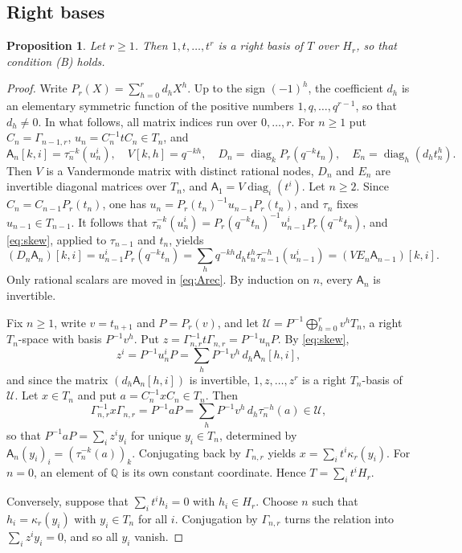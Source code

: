 \documentclass[11pt,a4paper]{amsart}
\newtheorem{proposition}[theorem]{Proposition}
\numberwithin{equation}{section}
\newcommand{\diag}{\operatorname{diag}}
\newcommand{\Q}{\mathbb{Q}}
\newcommand{\Asf}{\mathsf{A}}
\begin{document}
\subsection{Right bases}

\begin{proposition}\label{prop:B}
Let $r\ge1$. Then $1,t,\dots,t^r$ is a right basis of $T$ over $H_r$, so that condition \textup{(B)} holds.
\end{proposition}

\begin{proof}
Write $P_r(X)=\sum_{h=0}^{r}d_hX^h$. Up to the sign $(-1)^h$, the coefficient $d_h$ is an elementary symmetric function of the positive numbers $1,q,\dots,q^{r-1}$, so that $d_h\ne0$. In what follows, all matrix indices run over $0,\dots,r$. For $n\ge1$ put $C_n=\Gamma_{n-1,r}$, $u_n=C_n^{-1}tC_n\in T_n$, and
\[
\Asf_n[k,i]=\tau_n^{-k}(u_n^i),\quad V[k,h]=q^{-kh},\quad D_n=\diag_kP_r(q^{-k}t_n),\quad E_n=\diag_h(d_ht_n^h).
\]
Then $V$ is a Vandermonde matrix with distinct rational nodes, $D_n$ and $E_n$ are invertible diagonal matrices over $T_n$, and $\Asf_1=V\diag_i(t^i)$. Let $n\ge2$. Since $C_n=C_{n-1}P_r(t_n)$, one has $u_n=P_r(t_n)^{-1}u_{n-1}P_r(t_n)$, and $\tau_n$ fixes $u_{n-1}\in T_{n-1}$. It follows that $\tau_n^{-k}(u_n^i)=P_r(q^{-k}t_n)^{-1}u_{n-1}^iP_r(q^{-k}t_n)$, and \eqref{eq:skew}, applied to $\tau_{n-1}$ and $t_n$, yields
\begin{equation}\label{eq:Arec}
(D_n\Asf_n)[k,i]=u_{n-1}^iP_r(q^{-k}t_n)=\sum_hq^{-kh}d_ht_n^h\tau_{n-1}^{-h}(u_{n-1}^i)=(VE_n\Asf_{n-1})[k,i].
\end{equation}
Only rational scalars are moved in \eqref{eq:Arec}. By induction on $n$, every $\Asf_n$ is invertible.

Fix $n\ge1$, write $v=t_{n+1}$ and $P=P_r(v)$, and let $\mathcal U=P^{-1}\bigoplus_{h=0}^{r}v^hT_n$, a right $T_n$-space with basis $P^{-1}v^h$. Put $z=\Gamma_{n,r}^{-1}t\Gamma_{n,r}=P^{-1}u_nP$. By \eqref{eq:skew},
\begin{equation}\label{eq:zpowers}
z^i=P^{-1}u_n^iP=\sum_{h}P^{-1}v^h\,d_h\Asf_n[h,i],
\end{equation}
and since the matrix $(d_h\Asf_n[h,i])$ is invertible, $1,z,\dots,z^r$ is a right $T_n$-basis of $\mathcal U$. Let $x\in T_n$ and put $a=C_n^{-1}xC_n\in T_n$. Then
\[
\Gamma_{n,r}^{-1}x\Gamma_{n,r}=P^{-1}aP=\sum_hP^{-1}v^h\,d_h\tau_n^{-h}(a)\in\mathcal U,
\]
so that $P^{-1}aP=\sum_iz^iy_i$ for unique $y_i\in T_n$, determined by $\Asf_n(y_i)_i=(\tau_n^{-k}(a))_k$. Conjugating back by $\Gamma_{n,r}$ yields $x=\sum_it^i\kappa_r(y_i)$. For $n=0$, an element of $\Q$ is its own constant coordinate. Hence $T=\sum_it^iH_r$.

Conversely, suppose that $\sum_it^ih_i=0$ with $h_i\in H_r$. Choose $n$ such that $h_i=\kappa_r(y_i)$ with $y_i\in T_n$ for all $i$. Conjugation by $\Gamma_{n,r}$ turns the relation into $\sum_iz^iy_i=0$, and so all $y_i$ vanish.
\end{proof}
\end{document}
